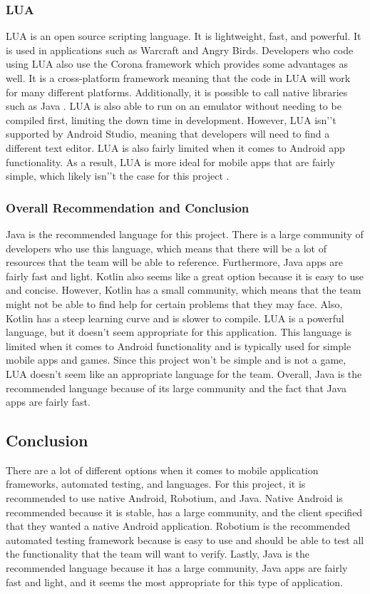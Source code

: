 \documentclass[onecolumn, draftclsnofoot,10pt, compsoc]{IEEEtran}
\begin{document}
\subsubsection{LUA}
LUA is an open source scripting language. It is lightweight, fast, and powerful. It is used in applications such as Warcraft and Angry Birds. Developers who code using LUA also use the Corona framework which provides some advantages as well. It is a cross-platform framework meaning that the code in LUA will work for many different platforms. Additionally, it is possible to call native libraries such as Java \cite{W-Corona}. LUA is also able to run on an emulator without needing to be compiled first, limiting the down time in development. However, LUA isn'’t supported by Android Studio, meaning that developers will need to find a different text editor. LUA is also fairly limited when it comes to Android app functionality. As a result, LUA is more ideal for mobile apps that are fairly simple, which likely isn'’t the case for this project \cite{W-Corona2}. 

\subsubsection{Overall Recommendation and Conclusion}
Java is the recommended language for this project. There is a large community of developers who use this language, which means that there will be a lot of resources that the team will be able to reference. Furthermore, Java apps are fairly fast and light. Kotlin also seems like a great option because it is easy to use and concise. However, Kotlin has a small community, which means that the team might not be able to find help for certain problems that they may face. Also, Kotlin has a steep learning curve and is slower to compile. LUA is a powerful language, but it doesn't seem appropriate for this application. This language is limited when it comes to Android functionality and is typically used for simple mobile apps and games. Since this project won't be simple and is not a game, LUA doesn't seem like an appropriate language for the team. Overall, Java is the recommended language because of its large community and the fact that Java apps are fairly fast.

\subsection{Conclusion}
There are a lot of different options when it comes to mobile application frameworks, automated testing, and languages. For this project, it is recommended to use native Android, Robotium, and Java.  Native Android is recommended because it is stable, has a large community, and the client specified that they wanted a native Android application. Robotium is the recommended automated testing framework because is easy to use and should be able to test all the functionality that the team will want to verify. Lastly, Java is the recommended language because it has a large community, Java apps are fairly fast and light, and it seems the most appropriate for this type of application.
 
\end{document}
